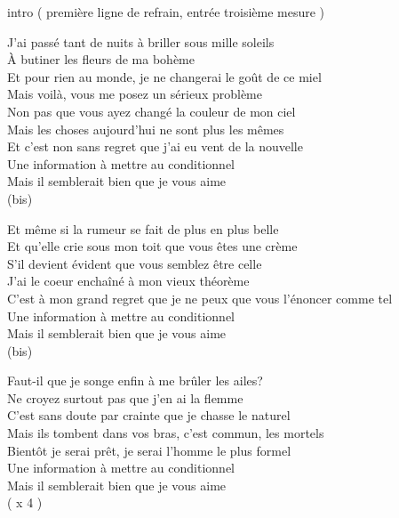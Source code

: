 intro ( première ligne de refrain, entrée troisième mesure )

J'ai passé tant de nuits à briller sous mille soleils \\ 
À butiner les fleurs de ma bohème \\

Et pour rien au monde, je ne changerai le goût de ce miel \\
Mais voilà, vous me posez un sérieux problème \\
Non pas que vous ayez changé la couleur de mon ciel \\
Mais les choses aujourd'hui ne sont plus les mêmes \\
Et c'est non sans regret que j'ai eu vent de la nouvelle \\

Une information à mettre au conditionnel \\
Mais il semblerait bien que je vous aime \\
(bis)


Et même si la rumeur se fait de plus en plus belle \\
Et qu'elle crie sous mon toit que vous êtes une crème \\
S'il devient évident que vous semblez être celle \\
J'ai le coeur enchaîné à mon vieux théorème \\
C'est à mon grand regret que je ne peux que vous l'énoncer comme tel \\

Une information à mettre au conditionnel \\
Mais il semblerait bien que je vous aime \\
(bis)

Faut-il que je songe enfin à me brûler les ailes? \\
Ne croyez surtout pas que j'en ai la flemme \\
C'est sans doute par crainte que je chasse le naturel \\
Mais ils tombent dans vos bras, c'est commun, les mortels \\
Bientôt je serai prêt, je serai l'homme le plus formel \\

Une information à mettre au conditionnel \\ 
Mais il semblerait bien que je vous aime \\
( x 4 )
